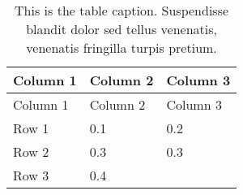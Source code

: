 \documentclass[11pt,letterpaper,]{article}
\begin{document}
\begin{longtable}[c]{@{}lll@{}}
\caption{This is the table caption. Suspendisse blandit dolor sed tellus
venenatis, venenatis fringilla turpis pretium.
\label{ref_a_table}}\tabularnewline
\toprule
\begin{minipage}[b]{0.25\columnwidth}\raggedright\strut
Column 1
\strut\end{minipage} &
\begin{minipage}[b]{0.30\columnwidth}\raggedright\strut
Column 2
\strut\end{minipage} &
\begin{minipage}[b]{0.24\columnwidth}\raggedright\strut
Column 3
\strut\end{minipage}\tabularnewline
\midrule
\endfirsthead
\toprule
\begin{minipage}[b]{0.25\columnwidth}\raggedright\strut
Column 1
\strut\end{minipage} &
\begin{minipage}[b]{0.30\columnwidth}\raggedright\strut
Column 2
\strut\end{minipage} &
\begin{minipage}[b]{0.24\columnwidth}\raggedright\strut
Column 3
\strut\end{minipage}\tabularnewline
\midrule
\endhead
\begin{minipage}[t]{0.25\columnwidth}\raggedright\strut
Row 1
\strut\end{minipage} &
\begin{minipage}[t]{0.30\columnwidth}\raggedright\strut
0.1
\strut\end{minipage} &
\begin{minipage}[t]{0.24\columnwidth}\raggedright\strut
0.2
\strut\end{minipage}\tabularnewline
\begin{minipage}[t]{0.25\columnwidth}\raggedright\strut
Row 2
\strut\end{minipage} &
\begin{minipage}[t]{0.30\columnwidth}\raggedright\strut
0.3
\strut\end{minipage} &
\begin{minipage}[t]{0.24\columnwidth}\raggedright\strut
0.3
\strut\end{minipage}\tabularnewline
\begin{minipage}[t]{0.25\columnwidth}\raggedright\strut
Row 3
\strut\end{minipage} &
\begin{minipage}[t]{0.30\columnwidth}\raggedright\strut
0.4
\strut\end{minipage} &

\end{longtable}
\end{document}
